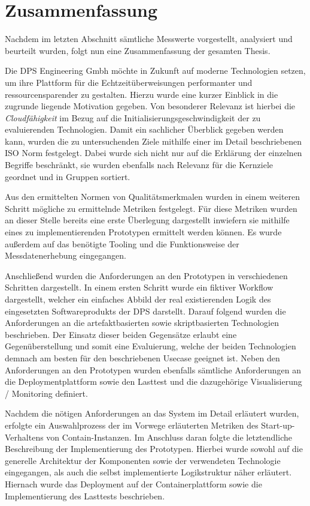 \chapter{Zusammenfassung}

Nachdem im letzten Abschnitt sämtliche Messwerte vorgestellt, analysiert und beurteilt wurden, folgt nun eine Zusammenfassung der gesamten Thesis.

Die DPS Engineering Gmbh möchte in Zukunft auf moderne Technologien setzen, um ihre Plattform für die Echtzeitüberweisungen performanter und ressourcensparender zu gestalten. Hierzu wurde eine kurzer Einblick in die zugrunde liegende Motivation gegeben. Von besonderer Relevanz ist hierbei die \emph{Cloudfähigkeit} im Bezug auf die Initialisierungsgeschwindigkeit der zu evaluierenden Technologien. Damit ein sachlicher Überblick gegeben werden kann, wurden die zu untersuchenden Ziele mithilfe einer im Detail beschriebenen ISO Norm festgelegt. Dabei wurde sich nicht nur auf die Erklärung der einzelnen Begriffe beschränkt, sie wurden ebenfalls nach Relevanz für die Kernziele geordnet und in Gruppen sortiert.

Aus den ermittelten Normen von Qualitätsmerkmalen wurden in einem weiteren Schritt mögliche zu ermittelnde Metriken festgelegt. Für diese Metriken wurden an dieser Stelle bereits eine erste Überlegung dargestellt inwiefern sie mithilfe eines zu implementierenden Prototypen ermittelt werden können. Es wurde außerdem auf das benötigte Tooling und die Funktionsweise der Messdatenerhebung eingegangen. 

Anschließend wurden die Anforderungen an den Prototypen in verschiedenen Schritten dargestellt. In einem ersten Schritt wurde ein fiktiver Workflow dargestellt, welcher ein einfaches Abbild der real existierenden Logik des eingesetzten Softwareprodukts der DPS darstellt. Darauf folgend wurden die Anforderungen an die artefaktbasierten sowie skriptbasierten Technologien beschrieben. Der Einsatz dieser beiden Gegensätze erlaubt eine Gegenüberstellung und somit eine Evaluierung, welche der beiden Technologien demnach am besten für den beschriebenen Usecase geeignet ist. Neben den Anforderungen an den Prototypen wurden ebenfalls sämtliche Anforderungen an die Deploymentplattform sowie den Lasttest und die dazugehörige Visualisierung / Monitoring definiert. 

Nachdem die nötigen Anforderungen an das System im Detail erläutert wurden, erfolgte ein Auswahlprozess der im Vorwege erläuterten Metriken des Start-up-Verhaltens von Contain-Instanzen. Im Anschluss daran folgte die letztendliche Beschreibung der Implementierung des Prototypen. Hierbei wurde sowohl auf die generelle Architektur der Komponenten sowie der verwendeten Technologie eingegangen, als auch die selbst implementierte Logikstruktur näher erläutert. Hiernach wurde das Deployment auf der Containerplattform sowie die Implementierung des Lasttests beschrieben.


